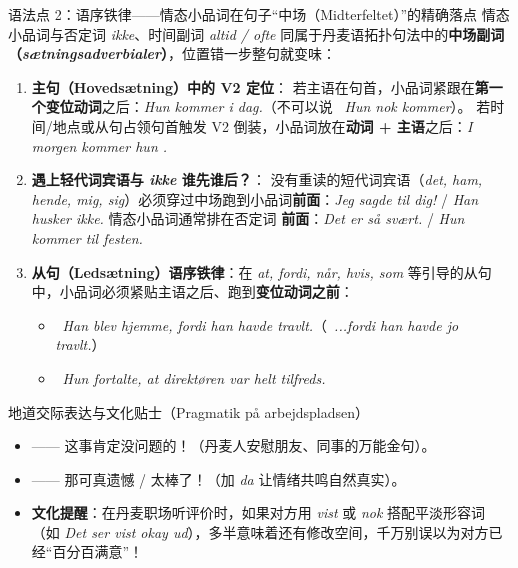 \begin{grammatikbox}{语法点 2：语序铁律——情态小品词在句子“中场（Midterfeltet）”的精确落点}
情态小品词与否定词 \textit{ikke}、时间副词 \textit{altid / ofte} 同属于丹麦语拓扑句法中的\textbf{中场副词（\textit{sætningsadverbialer}）}，位置错一步整句就变味：
\begin{enumerate}
  \item \textbf{主句（Hovedsætning）中的 V2 定位}： 若主语在句首，小品词紧跟在\textbf{第一个变位动词}之后：\textit{Hun kommer  i dag.}（不可以说 \ \textit{Hun nok kommer}）。 若时间/地点或从句占领句首触发 V2 倒装，小品词放在\textbf{动词 + 主语}之后：\textit{I morgen kommer hun .}
  \item \textbf{遇上轻代词宾语与 \textit{ikke} 谁先谁后？}： 没有重读的短代词宾语（\textit{det, ham, hende, mig, sig}）必须穿过中场跑到小品词\textbf{前面}：\textit{Jeg sagde  til dig!} / \textit{Han husker  ikke.}  情态小品词通常排在否定词  \textbf{前面}：\textit{Det er  så svært.} / \textit{Hun kommer  til festen.}
  \item \textbf{从句（Ledsætning）语序铁律}：在 \textit{at, fordi, når, hvis, som} 等引导的从句中，小品词必须紧贴主语之后、跑到\textbf{变位动词之前}：
    \begin{itemize}
      \item {}\ \textit{Han blev hjemme, fordi han  havde travlt.}（\ \textit{...fordi han havde jo travlt.}）
      \item {}\ \textit{Hun fortalte, at direktøren  var helt tilfreds.}
    \end{itemize}
\end{enumerate}
\end{grammatikbox}

\begin{grammatikbox}{地道交际表达与文化贴士（Pragmatik på arbejdspladsen）}
\begin{itemize}
  \item {} —— 这事肯定没问题的！（丹麦人安慰朋友、同事的万能金句）。
  \item {} —— 那可真遗憾 / 太棒了！（加 \textit{da} 让情绪共鸣自然真实）。
  \item \textbf{文化提醒}：在丹麦职场听评价时，如果对方用 \textit{vist} 或 \textit{nok} 搭配平淡形容词（如 \textit{Det ser vist okay ud}），多半意味着还有修改空间，千万别误以为对方已经“百分百满意”！
\end{itemize}
\end{grammatikbox}

